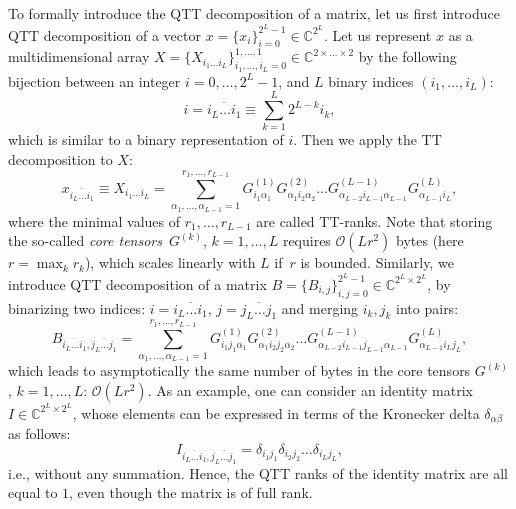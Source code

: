 \documentclass[a4paper]{article}
\newcommand{\LL}{L}
\begin{document}
To formally introduce the QTT decomposition of a matrix, let us first introduce QTT decomposition of a vector $x = \{x_i\}_{i=0}^{2^\LL-1}\in\mathbb{C}^{2^\LL}$. %
Let us represent $x$ as a multidimensional array $X = \{X_{i_1\dots i_\LL}\}_{i_1,\dots, i_\LL=0}^{1,\dots,1}\in\mathbb{C}^{2\times \dots \times 2}$ by the following bijection between an integer $i=0,\dots,2^\LL-1$, and $\LL$ binary indices $(i_1,\dots,i_\LL)$: %
\[
    i =\overline{i_\LL \dots i_1} \equiv \sum_{k = 1}^\LL 2^{\LL - k} i_k,
\]
which is similar to a binary representation of $i$.
Then we apply the TT decomposition to $X$:
\[
    x_{\overline{i_\LL \dots i_1}} \equiv X_{i_1\dots i_\LL} = \sum_{\alpha_1,\dots,\alpha_{\LL-1}=1}^{r_1,\dots,r_{\LL-1}} G_{i_1 \alpha_1}^{(1)} G_{\alpha_1 i_2 \alpha_2}^{(2)} \dots G_{\alpha_{\LL-2} i_{\LL-1} \alpha_{\LL-1}}^{(\LL-1)} G_{\alpha_{\LL-1} i_\LL}^{(\LL)},
\]
where the minimal values of $r_1,\dots,r_{\LL-1}$ are called TT-ranks.
Note that storing the so-called \emph{core tensors}~$G^{(k)}$, $k=1,\dots,\LL$ requires $\mathcal{O}(\LL r^2)$ bytes (here $r=\max_k r_k$), which scales linearly with $\LL$ if~$r$ is bounded.
Similarly, we introduce QTT decomposition of a matrix $B = \{B_{i,j}\}_{i,j=0}^{2^\LL-1} \in\mathbb{C}^{2^\LL\times 2^\LL}$, by binarizing two indices: $i =\overline{i_\LL \dots i_1}$, $j =\overline{j_\LL \dots j_1}$ and merging $i_k,j_k$ into pairs: 
\begin{equation}\label{eq:tt_mat}
    B_{\overline{i_\LL \dots i_1}, \overline{j_\LL \dots j_1}} = 
    \sum_{\alpha_1,\dots,\alpha_{\LL-1}=1}^{r_1,\dots,r_{\LL-1}}
    G_{i_1 j_1 \alpha_1}^{(1)} G_{\alpha_1 i_2j_2 \alpha_2}^{(2)} \dots G_{\alpha_{\LL-2} i_{\LL-1}j_{\LL-1} \alpha_{\LL-1}}^{(\LL-1)} G_{\alpha_{\LL-1} i_\LL j_\LL}^{(\LL)},
\end{equation}
which leads to asymptotically the same number of bytes in the core tensors $G^{(k)}$, $k=1,\dots,\LL$: $\mathcal{O}(\LL r^2)$.
As an example, one can consider an identity matrix $I\in\mathbb{C}^{2^\LL\times 2^\LL}$, whose elements can be expressed in terms of the Kronecker delta $\delta_{\alpha \beta}$ as follows:
\[
    I_{\overline{i_\LL \dots i_1}, \overline{j_\LL \dots j_1}} = \delta_{i_1 j_1} \delta_{i_2 j_2} \dots \delta_{i_\LL j_\LL},
\]
i.e., without any summation. Hence, the QTT ranks of the identity matrix are all equal to $1$, even though the matrix is of full rank.
\end{document}
